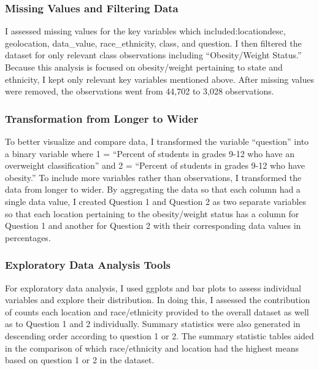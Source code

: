 \documentclass[
]{article}
\begin{document}
\subsubsection{Missing Values and Filtering
Data}\label{missing-values-and-filtering-data}

I assessed missing values for the key variables which
included:locationdesc, geolocation, data\_value, race\_ethnicity, class,
and question. I then filtered the dataset for only relevant class
observations including ``Obesity/Weight Status.'' Because this analysis
is focused on obesity/weight pertaining to state and ethnicity, I kept
only relevant key variables mentioned above. After missing values were
removed, the observations went from 44,702 to 3,028 observations.

\subsubsection{Transformation from Longer to
Wider}\label{transformation-from-longer-to-wider}

To better visualize and compare data, I transformed the variable
``question'' into a binary variable where 1 = ``Percent of students in
grades 9-12 who have an overweight classification'' and 2 = ``Percent of
students in grades 9-12 who have obesity.'' To include more variables
rather than observations, I transformed the data from longer to wider.
By aggregating the data so that each column had a single data value, I
created Question 1 and Question 2 as two separate variables so that each
location pertaining to the obesity/weight status has a column for
Question 1 and another for Question 2 with their corresponding data
values in percentages.

\subsubsection{Exploratory Data Analysis
Tools}\label{exploratory-data-analysis-tools}

For exploratory data analysis, I used ggplots and bar plots to assess
individual variables and explore their distribution. In doing this, I
assessed the contribution of counts each location and race/ethnicity
provided to the overall dataset as well as to Question 1 and 2
individually. Summary statistics were also generated in descending order
according to question 1 or 2. The summary statistic tables aided in the
comparison of which race/ethnicity and location had the highest means
based on question 1 or 2 in the dataset.
\end{document}
